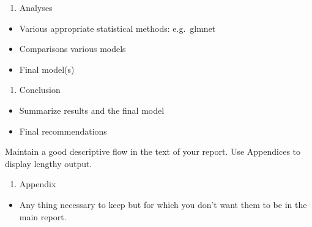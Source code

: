 \documentclass[
]{article}
\providecommand{\tightlist}{%
  \setlength{\itemsep}{0pt}\setlength{\parskip}{0pt}}
\begin{document}
\begin{enumerate}
\def\labelenumi{\roman{enumi})}
\setcounter{enumi}{1}
\tightlist
\item
  Analyses
\end{enumerate}

\begin{itemize}
\tightlist
\item
  Various appropriate statistical methods: e.g.~glmnet
\item
  Comparisons various models
\item
  Final model(s)
\end{itemize}

\begin{enumerate}
\def\labelenumi{\roman{enumi})}
\setcounter{enumi}{2}
\tightlist
\item
  Conclusion
\end{enumerate}

\begin{itemize}
\tightlist
\item
  Summarize results and the final model
\item
  Final recommendations
\end{itemize}

Maintain a good descriptive flow in the text of your report. Use
Appendices to display lengthy output.

\begin{enumerate}
\def\labelenumi{\roman{enumi})}
\setcounter{enumi}{2}
\tightlist
\item
  Appendix
\end{enumerate}

\begin{itemize}
\tightlist
\item
  Any thing necessary to keep but for which you don't want them to be in
  the main report.
\end{itemize}
\end{document}
